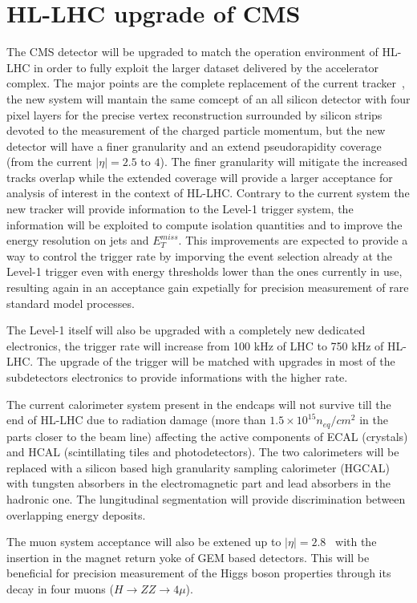 \section{HL-LHC upgrade of CMS}
\label{upgrade_cms}
The CMS detector will be upgraded to match the operation environment of HL-LHC in order to fully exploit the
larger dataset delivered by the accelerator complex.
The major points are the complete replacement of the current tracker~\cite{trk_phase2_tdr}, the new system will mantain
the same comcept of an all silicon detector with four pixel layers for the precise vertex reconstruction
surrounded by silicon strips devoted to the measurement of the charged particle momentum, but the new detector
will have a finer granularity and an extend pseudorapidity coverage (from the current $|\eta|=2.5$ to $4$).
The finer granularity will mitigate the increased tracks overlap while the extended coverage will provide
a larger acceptance for analysis of interest in the context of HL-LHC.
Contrary to the current system the new tracker will provide information to the Level-1 trigger system,
the information will be exploited to compute isolation quantities and to improve the energy resolution on jets
and $E_T^{miss}$. This improvements are expected to provide a way to control the trigger rate
by imporving the event selection already at the Level-1 trigger even with energy thresholds lower than the ones
currently in use, resulting again in an acceptance gain expetially for precision measurement of rare standard
model processes.

The Level-1 itself will also be upgraded with a completely new dedicated electronics, the trigger rate
will increase from 100 kHz of LHC to 750 kHz of HL-LHC. The upgrade of the trigger will be matched with
upgrades in most of the subdetectors electronics to provide informations with the higher rate.

The current calorimeter system present in the endcaps will not survive till the end of HL-LHC due to radiation
damage (more than $1.5\times10^{15} n_{eq}/cm^{2}$ in the parts closer to the beam line) affecting the active components of
ECAL (\PbWO crystals) and HCAL (scintillating tiles and photodetectors).
The two calorimeters will be replaced with a silicon based high granularity sampling calorimeter (HGCAL)
with tungsten absorbers in the
electromagnetic part and lead absorbers in the hadronic one. The lungitudinal segmentation will provide
discrimination between overlapping energy deposits.

The muon system acceptance will also be extened up to $|\eta| = 2.8$~\cite{muon_phase2_tdr} with the insertion in
the magnet return yoke of GEM based detectors. This will be beneficial for precision measurement of the Higgs boson
properties through its decay in four muons ($H\to ZZ\to 4 \mu$).

